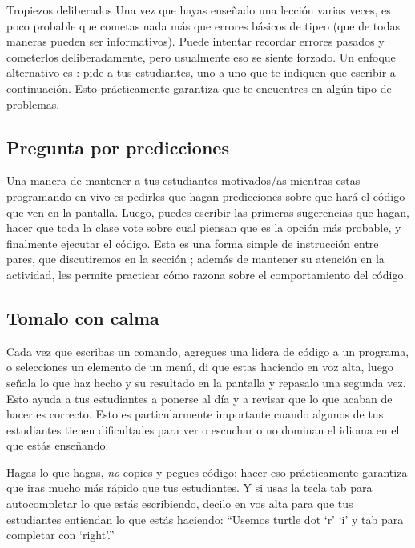 \begin{aside}{Tropiezos deliberados}
  Una vez que hayas enseñado una lección varias veces,
  es poco probable que cometas nada más que errores básicos de tipeo
  (que de todas maneras pueden ser informativos).
  Puede intentar recordar errores pasados y cometerlos deliberadamente,
  pero usualmente eso se siente forzado.
  Un enfoque alternativo es :
  pide a tus estudiantes, uno a uno que te indiquen que escribir a continuación.
  Esto prácticamente garantiza que te encuentres en algún tipo de problemas.
\end{aside}

\subsection*{Pregunta por predicciones}

Una manera de mantener a tus estudiantes motivados/as mientras estas programando en vivo
es pedirles que hagan predicciones sobre que hará el código que ven en la pantalla.
Luego, puedes escribir las primeras sugerencias que hagan,
hacer que toda la clase vote sobre cual piensan que es la opción más probable,
y finalmente ejecutar el código.
Esta es una forma simple de instrucción entre pares,
que discutiremos en la sección ;
además de mantener su atención en la actividad,
les permite practicar cómo razona sobre el comportamiento del código.

\subsection*{Tomalo con calma}

Cada vez que escribas un comando,
agregues una lidera de código a un programa,
o selecciones un elemento de un menú,
di que estas haciendo en voz alta,
luego señala lo que haz hecho y su resultado en la pantalla
y repasalo una segunda vez.
Esto ayuda a tus estudiantes a ponerse al día
y a revisar que lo que acaban de hacer es correcto.
Esto es particularmente importante cuando algunos de tus estudiantes tienen dificultades para ver o escuchar o no dominan el idioma en el que estás enseñando.

Hagas lo que hagas,
\emph{no} copies y pegues código:
hacer eso prácticamente garantiza que iras mucho más rápido que tus estudiantes.
Y si usas la tecla tab para autocompletar lo que estás escribiendo,
decilo en vos alta para que tus estudiantes entiendan lo que estás haciendo:
``Usemos turtle dot `r' `i' y tab para completar con `right'.''

